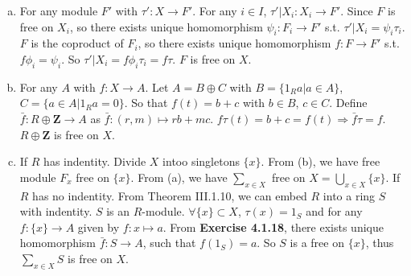\begin{answer}
    \begin{enumerate}[(a)]
        \item For any module $F'$ with $\tau':X\to F'$. For any $i\in I$, $\tau'|X_{i}:X_{i}\to F'$. Since $F$ is free on $X_{i}$, so there exists unique homomorphism $\psi_{i}:F_{i}\to F'$ s.t. $\tau'|X_{i}=\psi_{i}\tau_{i}$. $F$ is the coproduct of $F_{i}$, so there exists unique homomorphism $f:F\to F'$ s.t. $f\phi_{i}=\psi_{i}$. So $\tau'|X_{i}=f\phi_{i}\tau_{i}=f\tau$. $F$ is free on $X$.
        
        \begin{figure}[H]\centering
        \end{figure}
        \item For any $A$ with $f:X\to A$. Let $A=B\oplus C$ with $B=\{1_{R}a|a\in A\}$, $C=\{a\in A|1_{R}a=0\}$. So that $f(t)=b+c$ with $b\in B$, $c\in C$. Define $\bar{f}:R\oplus \mathbf{Z}\to A$ as $\bar{f}:(r,m)\mapsto rb+mc$. $f\tau(t)=b+c=f(t)\Rightarrow \bar{f}\tau=f$. $R\oplus \mathbf{Z}$ is free on $X$.
        \item If $R$ has indentity. Divide $X$ intoo singletons $\{x\}$. From (b), we have free module $F_{x}$ free on $\{x\}$. From (a), we have $\sum\limits_{x\in X}$ free on $X=\bigcup\limits_{x\in X}\{x\}$. If $R$ has no indentity. From Theorem III.1.10, we can embed $R$ into a ring $S$ with indentity. $S$ is an $R$-module. $\forall \{x\}\subset X$, $\tau(x)=1_{S}$ and for any $f:\{x\}\to A$ given by $f:x\mapsto a$. From \textbf{Exercise 4.1.18}, there exists unique homomorphism $\bar{f}:S\to A$, such that $f(1_{S})=a$. So $S$ is a free on $\{x\}$, thus $\sum\limits_{x\in X}S$ is free on $X$.
    \end{enumerate}
\end{answer}

